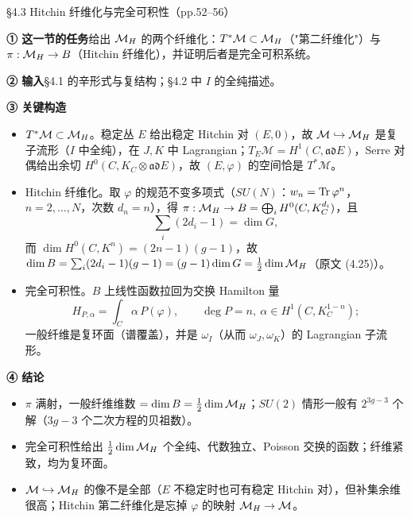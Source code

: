 \begin{kcard}{§4.3 Hitchin 纤维化与完全可积性（pp.52--56）}

\noindent\textbf{① 这一节的任务}\quad 给出 $\mathcal{M}_H$ 的两个纤维化：$T^*\mathcal M\subset\mathcal{M}_H$（"第二纤维化"）与 $\pi:\mathcal{M}_H\to B$（Hitchin 纤维化），并证明后者是完全可积系统。\pA{}

\noindent\textbf{② 输入}\quad \S4.1 的辛形式与复结构；\S4.2 中 $I$ 的全纯描述。

\noindent\textbf{③ 关键构造}\quad
\begin{itemize}
\item $T^*\mathcal M\subset\mathcal{M}_H$。稳定丛 $E$ 给出稳定 Hitchin 对 $(E,0)$，故 $\mathcal M\hookrightarrow\mathcal{M}_H$ 是复子流形（$I$ 中全纯），在 $J,K$ 中 Lagrangian；$T_E\mathcal M=H^1(C,\mathfrak{ad}E)$，Serre 对偶给出余切 $H^0(C,K_C\otimes\mathfrak{ad}E)$，故 $(E,\varphi)$ 的空间恰是 $T^*\mathcal M$。\pA{}
\item Hitchin 纤维化。取 $\varphi$ 的规范不变多项式（$SU(N)$：$w_n=\operatorname{Tr}\varphi^n$，$n=2,\dots,N$，次数 $d_n=n$），得 $\pi:\mathcal{M}_H\to B=\bigoplus_i H^0(C,K_C^{d_i})$，且
\begin{equation}\label{l1:dimB}\tag{4.24}
\sum_i(2d_i-1)=\dim G ,
\end{equation}
而 $\dim H^0(C,K^n)=(2n-1)(g-1)$，故 $\dim B=\sum_i(2d_i-1)(g-1)=(g-1)\dim G=\tfrac12\dim\mathcal{M}_H$（原文 (4.25)）。
\pA{}
\item 完全可积性。$B$ 上线性函数拉回为交换 Hamilton 量
\begin{equation}\label{l1:hpa}\tag{4.26}
H_{P,\alpha}=\int_C\alpha\,P(\varphi),\qquad \deg P=n,\ \alpha\in H^1(C,K_C^{1-n}) ;
\end{equation}
一般纤维是复环面（谱覆盖），并是 $\omega_I$（从而 $\omega_J,\omega_K$）的 Lagrangian 子流形。\pA{}
\end{itemize}

\noindent\textbf{④ 结论}\quad
\begin{itemize}
\item $\pi$ 满射，一般纤维维数 $=\dim B=\frac12\dim\mathcal{M}_H$；$SU(2)$ 情形一般有 $2^{3g-3}$ 个解（$3g-3$ 个二次方程的贝祖数）。\pA{}
\item 完全可积性给出 $\frac12\dim\mathcal{M}_H$ 个全纯、代数独立、Poisson 交换的函数；纤维紧致，均为复环面。\pA{}
\item $\mathcal M\hookrightarrow\mathcal{M}_H$ 的像不是全部（$E$ 不稳定时也可有稳定 Hitchin 对），但补集余维很高；Hitchin 第二纤维化是忘掉 $\varphi$ 的映射 $\mathcal{M}_H\to\mathcal M$。\pA{}
\end{itemize}


\end{kcard}
